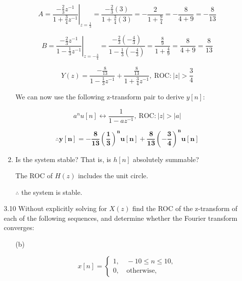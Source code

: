 \documentclass[fleqn]{article}
\begin{document}
\begin{enumerate}[nolistsep]
\begin{enumerate}[nolistsep]
				\begin{equation*}
					A = \left.\frac{-\frac{2}{3}z^{-1}}{1 + \frac{3}{4}z^{-1}}\right\vert_{z = \frac{1}{3}} = \frac{-\frac{2}{3}(3)}{1 + \frac{3}{4}(3)} = -\frac{2}{1 + \frac{9}{4}} = -\frac{8}{4 + 9} = -\frac{8}{13}
				\end{equation*}
					
				\begin{equation*}
					B = \left.\frac{-\frac{2}{3}z^{-1}}{1 - \frac{1}{3}z^{-1}}\right\vert_{z = -\frac{3}{4}} = \frac{-\frac{2}{3}\left(-\frac{4}{3}\right)}{1 - \frac{1}{3}\left(-\frac{4}{3}\right)} = \frac{\frac{8}{9}}{1 + \frac{4}{9}} = \frac{8}{4 + 9} = \frac{8}{13}
				\end{equation*}
				
				\pagebreak
				\begin{equation*}
					Y(z) = \frac{-\frac{8}{13}}{1 - \frac{1}{3}z^{-1}} + \frac{\frac{8}{13}}{1 + \frac{3}{4}z^{-1}},\ \text{ROC:}\ |z| > \frac{3}{4}
				\end{equation*}
				
				We can now use the following z-transform pair to derive $y[n]$:
				
				\begin{equation*}
					a^nu[n] \leftrightarrow \frac{1}{1 - az^{-1}},\ \text{ROC:}\ |z| > |a| 
				\end{equation*}
				
				\begin{equation*}
					\mathbf{\therefore y[n] = -\frac{8}{13}\left(\frac{1}{3}\right)^nu[n] + \frac{8}{13}\left(-\frac{3}{4}\right)^nu[n]}
				\end{equation*}
				
				
			\item Is the system stable? That is, is $h[n]$ absolutely summable?
			
				The ROC of $H(z)$ includes the unit circle.
				
				$\therefore$ the system is stable.
		\end{enumerate}
		
				
		\item [3.10] Without explicitly solving for $X(z)$ find the ROC of the z-transform of each of the following sequences, and determine whether the Fourier transform converges:
		
			\begin{enumerate}[nolistsep]
				\item [(b)]

					\begin{equation*}				
						x[n] = \left\{\begin{aligned} 1,& \ -10 \leq n \leq 10, \\ 
						0,& \ \text{otherwise}, \end{aligned}\right.
					\end{equation*}
					

\end{enumerate}
\end{enumerate}
\end{document}
